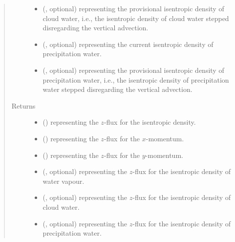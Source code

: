 \documentclass[letterpaper,10pt,english]{sphinxmanual}
\begin{document}
\begin{fulllineitems}
\begin{fulllineitems}
\begin{quote}
\begin{description}
\begin{itemize}
\item {} 
 (, optional) \textendash{}  representing the provisional isentropic density of cloud water,
i.e., the isentropic density of cloud water stepped disregarding the vertical advection.

\item {} 
 (, optional) \textendash{}  representing the current isentropic density of precipitation water.

\item {} 
 (, optional) \textendash{}  representing the provisional isentropic density of precipitation water,
i.e., the isentropic density of precipitation water stepped disregarding the vertical advection.

\end{itemize}

\item[{Returns}] \leavevmode
\begin{itemize}
\item {} 
 () \textendash{}  representing the \(z\)-flux for the isentropic density.

\item {} 
 () \textendash{}  representing the \(z\)-flux for the \(x\)-momentum.

\item {} 
 () \textendash{}  representing the \(z\)-flux for the \(y\)-momentum.

\item {} 
 (, optional) \textendash{}  representing the \(z\)-flux for the isentropic density of water vapour.

\item {} 
 (, optional) \textendash{}  representing the \(z\)-flux for the isentropic density of cloud water.

\item {} 
 (, optional) \textendash{}  representing the \(z\)-flux for the isentropic density of precipitation water.

\end{itemize}


\end{description}\end{quote}

\end{fulllineitems}


\end{fulllineitems}
\end{document}
